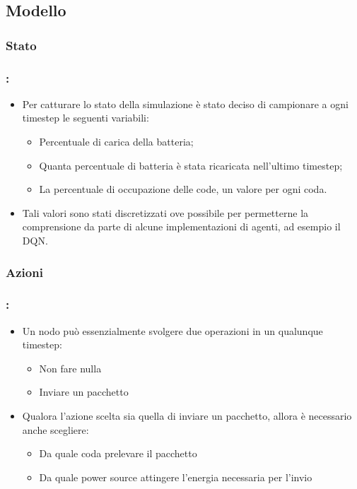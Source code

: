 \documentclass[compress]{beamer}
\begin{document}
\subsection{Modello}
\subsubsection{Stato}
\begin{frame}
    \frametitle{\subsecname: \subsubsecname}
    \begin{itemize}
        \item Per catturare lo stato della simulazione è stato deciso di campionare a ogni timestep le
        seguenti variabili:
        \begin{itemize}
            \item Percentuale di carica della batteria;
            \item Quanta percentuale di batteria è stata ricaricata nell'ultimo timestep;
            \item La percentuale di occupazione delle code, un valore per ogni coda. 
        \end{itemize}
        \item Tali valori sono stati discretizzati ove possibile per permetterne la comprensione da
        parte di alcune implementazioni di agenti, ad esempio il DQN.        
    \end{itemize}
\end{frame}

\subsubsection{Azioni}
\begin{frame}
    \frametitle{\subsecname: \subsubsecname}
    \begin{itemize}
        \item Un nodo può essenzialmente svolgere due operazioni in un qualunque timestep:
        \begin{itemize}
            \item Non fare nulla
            \item Inviare un pacchetto
        \end{itemize}
            \item Qualora l'azione scelta sia quella di inviare un pacchetto, allora è necessario anche
            scegliere:
        \begin{itemize}
            \item Da quale coda prelevare il pacchetto
            \item Da quale power source attingere l'energia necessaria per l'invio
        \end{itemize}
    \end{itemize}
\end{frame}
\end{document}
